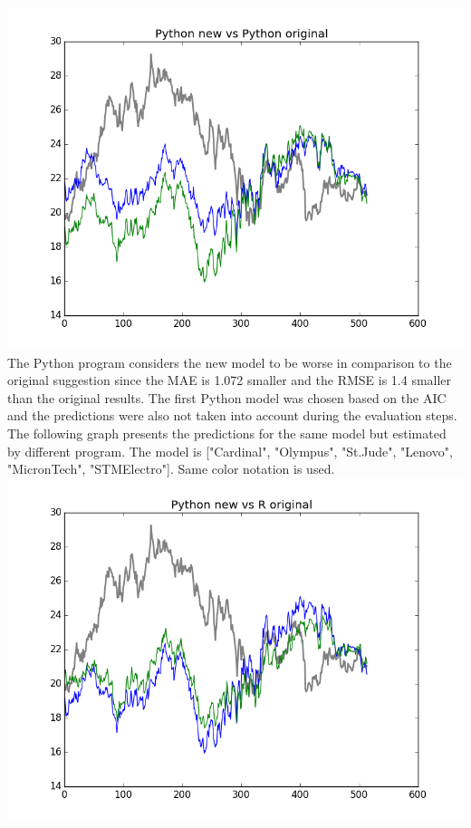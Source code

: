 \documentclass[
  twoside,
  11pt, a4paper,
  footinclude=true,
  headinclude=true,
  cleardoublepage=empty
]{scrreprt}
\begin{document}
    \includegraphics[scale=0.75]{PythonOriginalVsPythonNew.png}\\
    The Python program considers the new model to be worse in comparison to the original suggestion since the MAE is 1.072 smaller and the RMSE is 1.4 smaller than the original results. The first Python model was chosen based on the AIC and the predictions were also not taken into account during the evaluation steps.\\
    The following graph presents the predictions for the same model but estimated by different program. The model is ["Cardinal", "Olympus", "St.Jude", "Lenovo", "MicronTech", "STMElectro"]. Same color notation is used.\\
    \includegraphics[scale=0.75]{ROriginalVsPythonNew.png}
\end{document}
